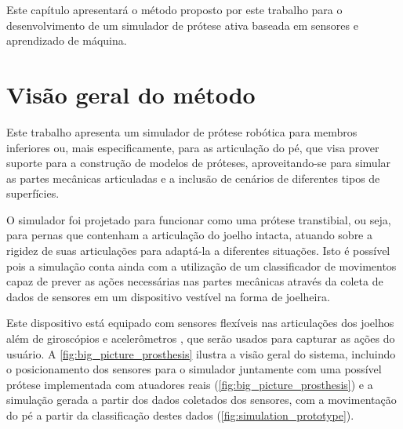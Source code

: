 Este capítulo apresentará o método proposto por este trabalho para o desenvolvimento de um simulador de prótese ativa baseada em sensores e aprendizado de máquina.

\section{Visão geral do método}\label{sec:metodo_protese}

Este trabalho apresenta um simulador de prótese robótica para membros inferiores ou, mais especificamente, para as articulação do pé, que visa prover suporte para a construção de modelos de próteses, aproveitando-se para simular as partes mecânicas articuladas e a inclusão de cenários de diferentes tipos de superfícies.

O simulador foi projetado para funcionar como uma prótese transtibial, ou seja, para pernas que contenham a articulação do joelho intacta, atuando sobre a rigidez de suas articulações para adaptá-la a diferentes situações. Isto é possível pois a simulação conta ainda com a utilização de um classificador de movimentos capaz de prever as ações necessárias nas partes mecânicas através da coleta de dados de sensores em um dispositivo vestível na forma de joelheira.

Este dispositivo está equipado com sensores flexíveis \cite{flex:datasheet} nas articulações dos joelhos além de giroscópios e acelerômetros \cite{invensense:imu_mpu}, que serão usados para capturar as ações do usuário. A \autoref{fig:big_picture_prosthesis} ilustra a visão geral do sistema, incluindo o posicionamento dos sensores para o simulador juntamente com uma possível prótese implementada com atuadores reais (\autoref{fig:big_picture_prosthesis}) e a simulação gerada a partir dos dados coletados dos sensores, com a movimentação do pé a partir da classificação destes dados (\autoref{fig:simulation_prototype}).


